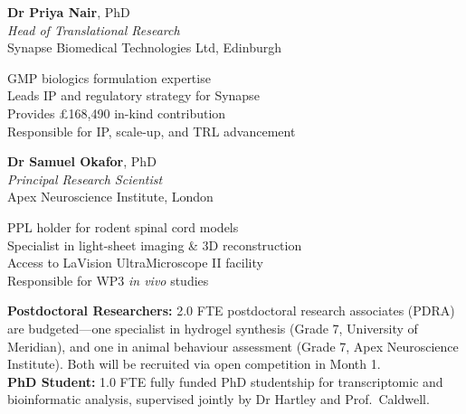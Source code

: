 \begin{minipage}[t]{0.48\textwidth}
\begin{tcolorbox}[sectionbox, title=Industry Co-Investigator]
\textbf{Dr Priya Nair}, PhD\\
\textit{Head of Translational Research}\\
Synapse Biomedical Technologies Ltd, Edinburgh

\vspace{4pt}
\bluebullet GMP biologics formulation expertise\\
\bluebullet Leads IP and regulatory strategy for Synapse\\
\bluebullet Provides \pounds 168,490 in-kind contribution\\
\bluebullet Responsible for IP, scale-up, and TRL advancement
\end{tcolorbox}
\end{minipage}%
\hfill
\begin{minipage}[t]{0.48\textwidth}
\begin{tcolorbox}[sectionbox, title=External Collaborator]
\textbf{Dr Samuel Okafor}, PhD\\
\textit{Principal Research Scientist}\\
Apex Neuroscience Institute, London

\vspace{4pt}
\bluebullet PPL holder for rodent spinal cord models\\
\bluebullet Specialist in light-sheet imaging \& 3D reconstruction\\
\bluebullet Access to LaVision UltraMicroscope II facility\\
\bluebullet Responsible for WP3 \emph{in vivo} studies
\end{tcolorbox}
\end{minipage}

\par
\vspace{6pt}

\begin{minipage}[t]{\textwidth}
\begin{tcolorbox}[highlightbox]
\textbf{Postdoctoral Researchers:}
2.0 FTE postdoctoral research associates (PDRA) are budgeted---one specialist in
hydrogel synthesis (Grade 7, University of Meridian), and one in animal behaviour
assessment (Grade 7, Apex Neuroscience Institute). Both will be recruited via open
competition in Month 1.\\[4pt]
\textbf{PhD Student:} 1.0 FTE fully funded PhD studentship for transcriptomic and
bioinformatic analysis, supervised jointly by Dr Hartley and Prof.\ Caldwell.
\end{tcolorbox}
\end{minipage}

\par

